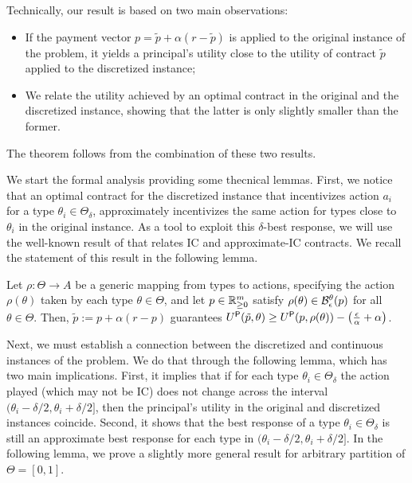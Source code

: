 Technically, our result is based on two main observations:
\begin{itemize}
\item If the payment vector $p= \tilde p +\alpha(r-\tilde p)$ is applied to the original instance of the problem, it yields a principal's utility close to the utility of contract $\tilde p$ applied to the discretized instance;
\item We relate the utility achieved by an optimal contract in the original and the discretized instance, showing that the latter is only slightly smaller than the former.
\end{itemize}
The theorem follows from the combination of these two results.



We start the formal analysis providing some thecnical lemmas. First, we notice that an optimal contract for the discretized instance that incentivizes action $a_i$ for a type $\theta_i\in \Theta_\delta$, approximately incentivizes the same action for types close to $\theta_i$ in the original instance.
As a tool to exploit this $\delta$-best response, we will use the well-known result of \citet{dutting2021complexity} that relates IC and approximate-IC contracts. We recall the statement of this result in the following lemma.
\begin{lemma}\label{lem:linearization}
Let $\rho:\Theta\to A$ be a generic mapping from types to actions, specifying the action $\rho(\theta)$ taken by each type $\theta\in\Theta$, and let $p\in\mathbb{R}^m_{\ge 0}$ satisfy $\rho(\theta)\in \mathcal{B}^{\theta}_{\epsilon}(p)$ for all $\theta\in\Theta$. Then, $\tilde p:=p+\alpha(r-p)$ guarantees $U^\textsf{P}(\tilde p,\theta)\ge U^\textsf{P}(p,\rho(\theta))-\left(\frac{\epsilon}{\alpha}+\alpha\right)$.
\end{lemma}

Next, we must establish a connection between the discretized and continuous instances of the problem. 
We do that through the following lemma, which has two main implications. 
First, it implies that if for each type $\theta_i\in \Theta_\delta$ the  action played (which may not be IC) does not change across the interval $(\theta_i-\delta/2, \theta_i+\delta/2]$, then the principal's utility in the original and discretized instances coincide.
Second, it shows that the best response of a type $\theta_i \in \Theta_\delta$ is still an approximate best response for each type in $(\theta_i-\delta/2, \theta_i+\delta/2]$.
In the following lemma, we prove a slightly more general result for arbitrary partition of $\Theta=[0,1]$.

